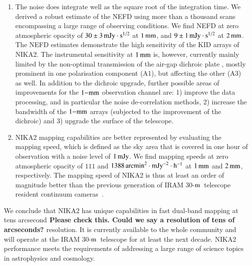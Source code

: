 \documentclass[traditionalabstract]{aa}
\newcommand{\trentemetre}{30-$\rm{m}$}
\newcommand{\lp}[1]{#1}
\newcommand{\LEt}[1]{{\bf {\color[RGB]{0, 153, 255} #1}}}
\begin{document}
{\begin{enumerate}
{    uncertainties for the diffuse emission must further include the
    uncertainties surrounding the reference beam efficiencies, as given in
    Table~\ref{tab:nika2summary}}. The absolute
  calibration uncertainties are of $5\%,$ and the systematic
  calibration uncertainties evaluated at the IRAM
  \trentemetre\ reference winter observing conditions are
  below $1\%$ in both channels.
   \vspace{1mm}
\item %
  The noise does integrate well as the square root of the integration time. We
  derived a robust estimate of the NEFD using more than a thousand scans
  encompassing a large range of observing conditions. We find NEFD at zero
  atmospheric opacity of $30 \pm 3\,\rm{mJy}\cdot s^{1/2}$ at $1\, \rm{mm}$, and
  $9 \pm 1\,\rm{mJy}\cdot s^{1/2}$ at $2\, \rm{mm}$.
  The NEFD estimates demonstrate the high sensitivity of
  the KID arrays of NIKA2. 
  The instrumental sensitivity at $1\,\rm{mm}$
  is, however, currently mainly limited by the non-optimal transmission of
  the air-gap dichroic plate%
  , mostly prominent in one polarisation component
  (A1), but affecting the other (A3) as well.
  In addition to the dichroic upgrade, further possible areas of
  improvements for the $1\rm{-mm}$ observation channel are: 1)
  improve the data processing, and in particular the noise
  de-correlation methods, 2) increase the bandwidth of the $1\rm{-mm}$
  arrays (subjected to the improvement of the dichroic) and 3)
  upgrade the surface of the telescope.
   \vspace{1mm}
\item  NIKA2 mapping capabilities are better represented by evaluating the
  mapping speed, which is defined as the sky area that is covered in one
  hour of observation with a noise level of $1\,\rm{mJy}$. We find
  mapping speeds at zero atmospheric opacity of $111$ and
  $1388\, \rm{arcmin}^2 \cdot \rm{mJy}^{-2} \cdot \rm{h}^{-1}$ at
  $1\, \rm{mm}$ and  $2\, \rm{mm}$, respectively. The mapping speed of NIKA2 is thus at
  least an order of magnitude better than the previous generation of IRAM
 \trentemetre\ telescope resident continuum cameras~\citep{Catalano2014, Staguhn2011_GISMO, Kreysa1999}.
  
\end{enumerate}


We conclude that NIKA2 has unique capabilities in fast dual-band
mapping at tens arcsecond\LEt{Please check this. Could we say a resolution of tens of arcseconds? } resolution. {\lp It is currently available to the
whole community and will operate at the IRAM \trentemetre\ telescope
for at least the next decade.}
NIKA2 performance meets the requirements
of addressing a large range of science topics in astrophysics and
cosmology. 


}
\end{document}
